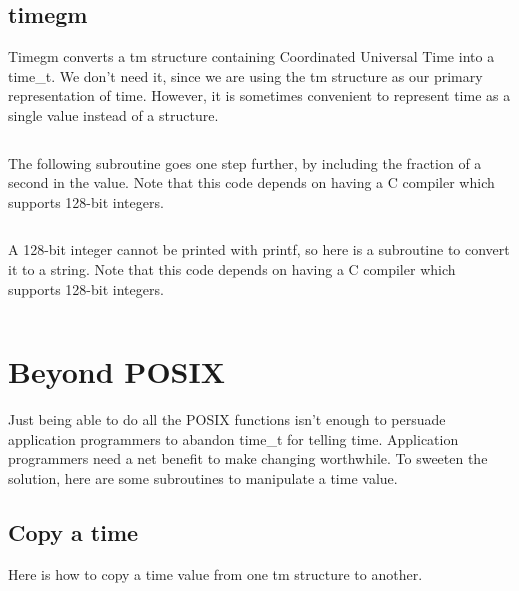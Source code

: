\documentclass[letterpaper,twoside]{article}
\begin{document}
\subsection{timegm}
Timegm converts a {\ttfamily tm} structure containing Coordinated Universal Time
into a {\ttfamily time\_t}.
We don't need it, since we are using the {\ttfamily tm} structure
as our primary representation of time.  However, it is sometimes
convenient to represent time as a single value instead of a structure.
\inputminted[firstline=32]{c}{src/time_tm_to_integer.c}

The following subroutine goes one step further, by including the
fraction of a second in the value.  Note that this code depends
on having a C compiler which supports 128-bit integers.
\inputminted[firstline=32]{c}{src/time_tm_nano_to_integer.c}

A 128-bit integer cannot be printed with printf, so here is a subroutine
to convert it to a string.  Note that this code depends on having
a C compiler which supports 128-bit integers.
\inputminted[firstline=32]{c}{src/int128_to_string.c}

\section{Beyond POSIX}
Just being able to do all the POSIX functions isn't enough to persuade
application programmers to abandon {\ttfamily time\_t} for telling time.
Application programmers
need a net benefit to make changing worthwhile.  To sweeten the solution,
here are some subroutines to manipulate a time value.

\subsection{Copy a time}
\label{subsection:copy}
Here is how to copy a time value from one {\ttfamily tm} structure to another.
\inputminted[firstline=34]{c}{src/time_copy.c}
\end{document}
